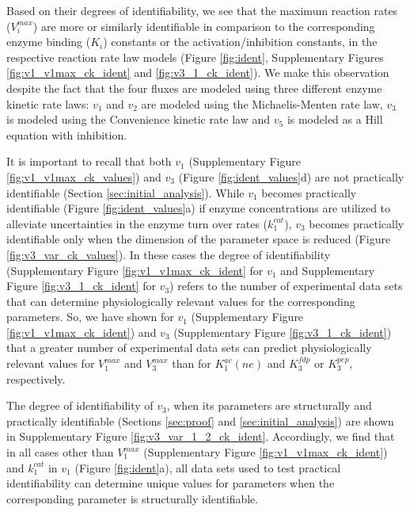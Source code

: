 \documentclass[10pt]{article}
\begin{document}
	Based on their degrees of identifiability, we see that the maximum reaction rates ($V_i^{max}$) are more or similarly identifiable in comparison to the corresponding enzyme binding ($K_i$) constants or the activation/inhibition constants, in the respective reaction rate law models (Figure \ref{fig:ident}, Supplementary Figures \ref{fig:v1_v1max_ck_ident} and \ref{fig:v3_1_ck_ident}). We make this observation despite the fact that the four fluxes are modeled using three different enzyme kinetic rate laws: $v_1$ and $v_2$ are modeled using the Michaelis-Menten rate law, $v_3$ is modeled using the Convenience kinetic rate law and $v_5$ is modeled as a Hill equation with inhibition.	
	
	It is important to recall that both $v_1$ (Supplementary Figure \ref{fig:v1_v1max_ck_values}) and $v_3$ (Figure \ref{fig:ident_values}d) are not practically identifiable (Section \ref{sec:initial_analysis}). While $v_1$ becomes practically identifiable (Figure \ref{fig:ident_values}a) if enzyme concentrations are utilized to alleviate uncertainties in the enzyme turn over rates ($k_1^{cat}$), $v_3$ becomes practically identifiable only when the dimension of the parameter space is reduced (Figure \ref{fig:v3_var_ck_values}). In these cases the degree of identifiability (Supplementary Figure \ref{fig:v1_v1max_ck_ident} for $v_1$ and Supplementary Figure \ref{fig:v3_1_ck_ident} for $v_3$) refers to the number of experimental data sets that can determine physiologically relevant values for the corresponding parameters. So, we have shown for $v_1$ (Supplementary Figure \ref{fig:v1_v1max_ck_ident}) and $v_3$ (Supplementary Figure \ref{fig:v3_1_ck_ident}) that a greater number of experimental data sets can predict physiologically relevant values for $V_1^{max}$ and $V_3^{max}$ than for $K_1^{ac}(ne)$ and $K_3^{fdp}$ or $K_3^{pep}$, respectively. 
	
	The degree of identifiability of $v_3$, when its parameters are structurally and practically identifiable (Sections \ref{sec:proof} and \ref{sec:initial_analysis}) are shown in Supplementary Figure \ref{fig:v3_var_1_2_ck_ident}. Accordingly, we find that in all cases other than $V_1^{max}$ (Supplementary Figure \ref{fig:v1_v1max_ck_ident}) and $k_1^{cat}$ in $v_1$ (Figure \ref{fig:ident}a), all data sets used to test practical identifiability can determine unique values for parameters when the corresponding parameter is structurally identifiable. 
	
\end{document}
